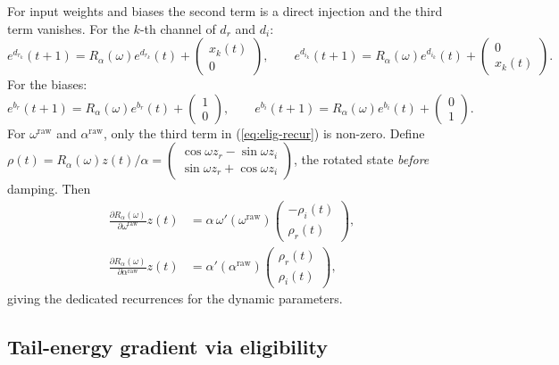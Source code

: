 \documentclass[11pt]{article}
\newcommand{\zr}{z_r}
\newcommand{\zi}{z_i}
\newcommand{\dr}{d_r}
\newcommand{\di}{d_i}
\newcommand{\br}{b_r}
\newcommand{\bi}{b_i}
\begin{document}
For input weights and biases the second term is a direct injection and
the third term vanishes. For the $k$-th channel of $\dr$ and $\di$:
\begin{equation}
e^{\dr_k}(t+1) = R_\alpha(\omega) e^{\dr_k}(t) + \begin{pmatrix} x_k(t) \\ 0 \end{pmatrix},
\qquad
e^{\di_k}(t+1) = R_\alpha(\omega) e^{\di_k}(t) + \begin{pmatrix} 0 \\ x_k(t) \end{pmatrix}.
\end{equation}
For the biases:
\begin{equation}
e^{\br}(t+1) = R_\alpha(\omega) e^{\br}(t) + \begin{pmatrix} 1 \\ 0 \end{pmatrix},
\qquad
e^{\bi}(t+1) = R_\alpha(\omega) e^{\bi}(t) + \begin{pmatrix} 0 \\ 1 \end{pmatrix}.
\end{equation}
For $\omega^{\mathrm{raw}}$ and $\alpha^{\mathrm{raw}}$, only the third
term in (\ref{eq:elig-recur}) is non-zero. Define $\rho(t) = R_\alpha(\omega) z(t)/\alpha
= \begin{pmatrix} \cos\omega \zr - \sin\omega \zi \\ \sin\omega \zr + \cos\omega \zi \end{pmatrix}$,
the rotated state \emph{before} damping. Then
\begin{align}
\frac{\partial R_\alpha(\omega)}{\partial \omega^{\mathrm{raw}}} z(t) &=
\alpha \, \omega'(\omega^{\mathrm{raw}}) \begin{pmatrix} -\rho_i(t) \\ \rho_r(t) \end{pmatrix},\\
\frac{\partial R_\alpha(\omega)}{\partial \alpha^{\mathrm{raw}}} z(t) &=
\alpha'(\alpha^{\mathrm{raw}}) \begin{pmatrix} \rho_r(t) \\ \rho_i(t) \end{pmatrix},
\end{align}
giving the dedicated recurrences for the dynamic parameters.

\subsection{Tail-energy gradient via eligibility}
\end{document}
